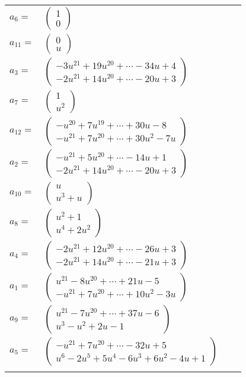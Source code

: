 \documentclass[1p]{elsarticle_modified}
\theoremstyle{definition}
\begin{document}
\begin{tabular}{m{7pt} m{180pt} m{7pt} m{180pt} }
\flushright $a_{6}=$&$\begin{pmatrix}1\\0\end{pmatrix}$ \\
\flushright $a_{11}=$&$\begin{pmatrix}0\\u\end{pmatrix}$ \\
\flushright $a_{3}=$&$\begin{pmatrix}-3 u^{21}+19 u^{20}+\cdots-34 u+4\\-2 u^{21}+14 u^{20}+\cdots-20 u+3\end{pmatrix}$ \\
\flushright $a_{7}=$&$\begin{pmatrix}1\\u^2\end{pmatrix}$ \\
\flushright $a_{12}=$&$\begin{pmatrix}- u^{20}+7 u^{19}+\cdots+30 u-8\\- u^{21}+7 u^{20}+\cdots+30 u^2-7 u\end{pmatrix}$ \\
\flushright $a_{2}=$&$\begin{pmatrix}- u^{21}+5 u^{20}+\cdots-14 u+1\\-2 u^{21}+14 u^{20}+\cdots-20 u+3\end{pmatrix}$ \\
\flushright $a_{10}=$&$\begin{pmatrix}u\\u^3+u\end{pmatrix}$ \\
\flushright $a_{8}=$&$\begin{pmatrix}u^2+1\\u^4+2 u^2\end{pmatrix}$ \\
\flushright $a_{4}=$&$\begin{pmatrix}-2 u^{21}+12 u^{20}+\cdots-26 u+3\\-2 u^{21}+14 u^{20}+\cdots-21 u+3\end{pmatrix}$ \\
\flushright $a_{1}=$&$\begin{pmatrix}u^{21}-8 u^{20}+\cdots+21 u-5\\- u^{21}+7 u^{20}+\cdots+10 u^2-3 u\end{pmatrix}$ \\
\flushright $a_{9}=$&$\begin{pmatrix}u^{21}-7 u^{20}+\cdots+37 u-6\\u^3- u^2+2 u-1\end{pmatrix}$ \\
\flushright $a_{5}=$&$\begin{pmatrix}- u^{21}+7 u^{20}+\cdots-32 u+5\\u^6-2 u^5+5 u^4-6 u^3+6 u^2-4 u+1\end{pmatrix}$\\&\end{tabular}
\end{document}
